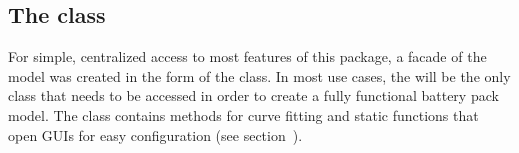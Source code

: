 \subsection{The  class}
For simple, centralized access to most features of this package, a facade of the model was created in the form of the  class. In most use cases, the  will be the only class that needs to be accessed in order to create a fully functional battery pack model. The class contains methods for curve fitting and static functions that open GUIs for easy configuration (see section~).